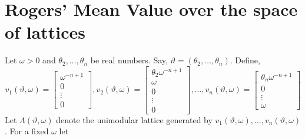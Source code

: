 \documentclass[11pt]{article}
\theoremstyle{definition}
\theoremstyle{proof}
\begin{document}
\section{Rogers' Mean Value over the space of lattices}
Let $\omega > 0$ and $\theta _2, \ldots, \theta _n$ be real numbers.
Say, $\vartheta = (\theta _2, \ldots, \theta _n)$.
Define,
\[
    v_1(\vartheta , \omega ) = 
    \begin{bmatrix}
        \omega ^{-n+1} \\
        0 \\
        \vdots \\
        0
    \end{bmatrix}
    ,
    v_2(\vartheta , \omega ) = 
    \begin{bmatrix}
        \theta _2 \omega ^{-n+1} \\
        \omega  \\
        0 \\
        \vdots \\
        0
    \end{bmatrix}
    , \ldots,
    v_n(\vartheta , \omega ) = 
    \begin{bmatrix}
        \theta _n \omega ^{-n+1} \\
        0 \\
        \vdots \\
        \omega 
    \end{bmatrix}
\]
Let $\Lambda (\vartheta , \omega )$ denote the unimodular lattice generated by $v_1(\vartheta , \omega ), \ldots , v_n(\vartheta , \omega )$.
For a fixed $\omega$ let
\end{document}
